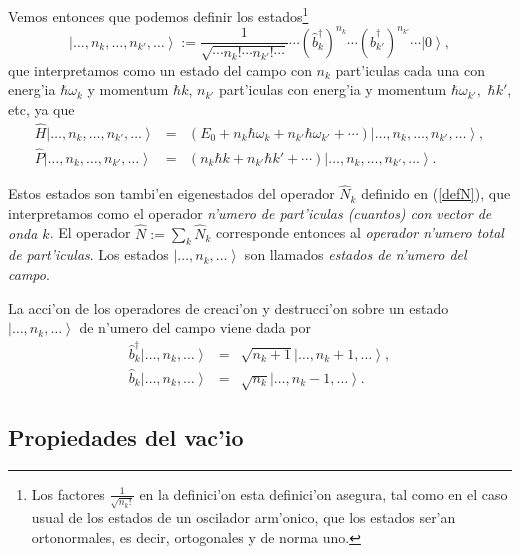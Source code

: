 Vemos entonces que podemos definir los estados\footnote{Los factores
$\frac{1}{\sqrt{n_k!}}$ en la definici'on esta definici'on asegura, tal como en
el caso usual de los estados de un oscilador arm'onico, que los estados ser'an
ortonormales, es decir, ortogonales y de norma uno.}
\begin{equation}
\left| \dots,n_k,\dots,n_{k'},\dots\right> :=\frac{1}{\sqrt{\cdots
n_k!\cdots n_{k'}!\cdots}}\cdots\left( \hat{b}_k^\dagger \right)
^{n_k}\cdots\left( \hat{b}_{k'}^\dagger \right) ^{n_{k'}}\cdots\left| 0\right>
,
\end{equation}
que interpretamos como un estado del campo con $n_k$ part'iculas cada una con
energ'ia $\hbar\omega_k$ y momentum $\hbar k$, $n_{k'}$ part'iculas con energ'ia
y momentum $\hbar\omega_{k'},$ $\hbar k'$, etc, ya que
\begin{eqnarray}
\hat{H}\left| \dots,n_k,\dots,n_{k'},\dots\right> &=& \left( E_0+n_k
\hbar\omega_k +n_{k'} \hbar\omega_{k'}+\cdots\right)  \left|
\dots,n_k,\dots,n_{k'},\dots\right> ,\\
\hat{P}\left| \dots,n_k,\dots,n_{k'},\dots\right> &=&  \left(n_k \hbar k
+n_{k'} \hbar {k'}+\cdots\right) \left| \dots,n_k,\dots,n_{k'},\dots\right> .
\end{eqnarray}

Estos estados son tambi'en eigenestados del operador $\hat{N}_k$ definido en
(\ref{defN}), que interpretamos como el operador \textit{n'umero de part'iculas
(cuantos) con vector de onda $k$}. El operador $\hat{N}:=\sum_k \hat{N}_k$
corresponde entonces al \textit{operador n'umero total de part'iculas}. Los
estados $\left| \dots,n_k,\dots\right>$ son llamados \textit{estados de n'umero
del campo}.

La acci'on de los operadores de creaci'on y destrucci'on sobre un estado $\left|
\dots,n_k,\dots\right>$ de n'umero del campo viene dada por
\begin{eqnarray}
\hat{b}_k^\dagger \left| \dots,n_k,\dots\right> & = &\sqrt{n_k+1}\left| \dots,n_k+1,\dots\right> ,\\
\hat{b}_k\left| \dots,n_k,\dots\right> & = &\sqrt{n_k}\left|
\dots,n_k-1,\dots\right> .
\end{eqnarray}


\subsection{Propiedades del vac'io}

